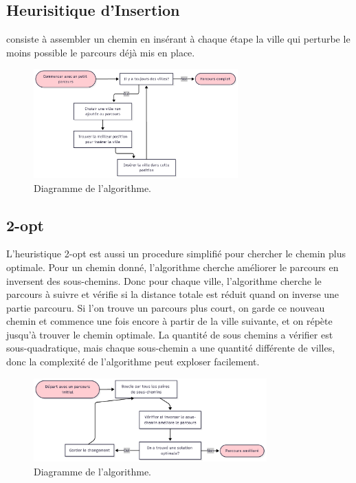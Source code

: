 \documentclass[a4paper,11pt,fleqn]{article}
\begin{document}
\subsection*{Heurisitique d’Insertion}
consiste à assembler un chemin en insérant à chaque étape la ville qui perturbe le moins possible le parcours déjà mis en place. 

\begin{figure}[H]
    \centering
    \includegraphics[width=0.7\textwidth]{images/charte-insert.png}
    \caption{Diagramme de l'algorithme.}
    \label{fig:charte-insert}
\end{figure}

\subsection*{2-opt}
L'heuristique 2-opt \cite{article:2opt} est aussi un procedure simplifié pour chercher le chemin plus optimale. Pour un chemin donné, l'algorithme cherche améliorer le parcours en inversent des sous-chemins. Donc pour chaque ville, l'algorithme cherche le parcours à suivre et vérifie si la distance totale est réduit quand on inverse une partie parcouru. Si l'on trouve un parcours plus court, on garde ce nouveau chemin et commence une fois encore à partir de la ville suivante, et on répète jusqu'à trouver le chemin optimale. La quantité de sous chemins a vérifier est sous-quadratique, mais chaque sous-chemin a une quantité différente de villes, donc la complexité de l'algorithme peut exploser facilement.

\begin{figure}[H]
    \centering
    \includegraphics[width=0.8\textwidth]{images/chart-2opt.png}
    \caption{Diagramme de l'algorithme.}
    \label{fig:charte-2opt}
\end{figure}
\end{document}
